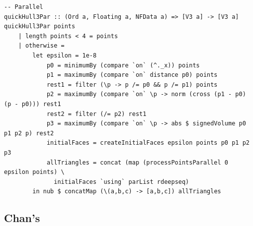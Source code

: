 \documentclass[12pt]{article}
\begin{document}
\begin{verbatim}
-- Parallel
quickHull3Par :: (Ord a, Floating a, NFData a) => [V3 a] -> [V3 a]
quickHull3Par points 
    | length points < 4 = points
    | otherwise = 
        let epsilon = 1e-8
            p0 = minimumBy (compare `on` (^._x)) points
            p1 = maximumBy (compare `on` distance p0) points
            rest1 = filter (\p -> p /= p0 && p /= p1) points
            p2 = maximumBy (compare `on` \p -> norm (cross (p1 - p0) (p - p0))) rest1
            rest2 = filter (/= p2) rest1
            p3 = maximumBy (compare `on` \p -> abs $ signedVolume p0 p1 p2 p) rest2
            initialFaces = createInitialFaces epsilon points p0 p1 p2 p3
            allTriangles = concat (map (processPointsParallel 0 epsilon points) \
              initialFaces `using` parList rdeepseq)
        in nub $ concatMap (\(a,b,c) -> [a,b,c]) allTriangles
    \end{verbatim}

  \subsection*{Chan's}
\end{document}
